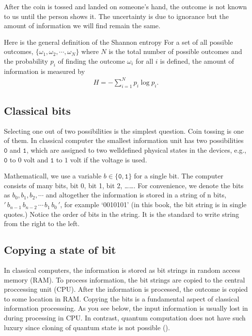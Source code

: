 \documentclass[letterpaper,10pt,english]{jupyterBook}
\begin{document}
\sphinxAtStartPar
After the coin is tossed and landed on someone’s hand,  the outcome is not known to us until the person shows it.  The uncertainty is due to ignorance but the amount of information we will find remain the same.

\sphinxAtStartPar
Here is the general definition of the Shannon entropy
For a set of all possible outcomes, \(\{\omega_1, \omega_2, \cdots, \omega_N\}\) where \(N\) is the total number of possible outcomes and the probability \(p_i\) of finding the outcome \(\omega_i\) for all \(i\) is defined,  the amount of  information  is measured by
\begin{equation*}
\begin{split}
H = - \sum_{i=1}^N p_i \log p_i.
\end{split}
\end{equation*}

\subsection{Classical bits}
\label{\detokenize{computation/ccomp:classical-bits}}
\sphinxAtStartPar
Selecting one out of two possibilities is the simplest question.  Coin tossing is one of them. In classical computer the smallest  information unit has two possibilities \(\texttt{0}\) and \(\texttt{1}\), which are assigned to two well\sphinxhyphen{}defined physical states in the devices, e.g.,  \(\texttt{0}\) to \(0\) volt and \(\texttt{1}\) to \(1\) volt if the voltage is used.

\sphinxAtStartPar
Mathematicall, we use a variable \(b \in \{\texttt{0},\texttt{1}\}\) for a single bit.  The computer consists of many bits, bit 0, bit 1, bit 2, …….  For convenience, we denote the bits as \(b_0, b_1, b_2, \cdots \) and altogether the information is stored in a string of n bits, \('\, b_{n-1}\, b_{n-2}\, \cdots\, b_1\, b_0\, '\), for example ‘0010101’ (in this book, the bit string is in single quotes.)  Notice the order of bits in the string.  It is the standard to write string from the right to the left.


\subsection{Copying a state of bit}
\label{\detokenize{computation/ccomp:copying-a-state-of-bit}}
\sphinxAtStartPar
In classical computers, the information is stored as bit strings in random access memory (RAM).  To process information, the bit strings are copied to the central proccessing unit (CPU).  After the information is processed, the outcome is copied to some location in RAM.   Copying the bits is a fundamental aspect of classical information processsing. As you see below, the input information is usually lost in during processing in CPU.  In contrast, quantum computation does not have such luxury since cloning of quantum state is not possible ().
\end{document}
